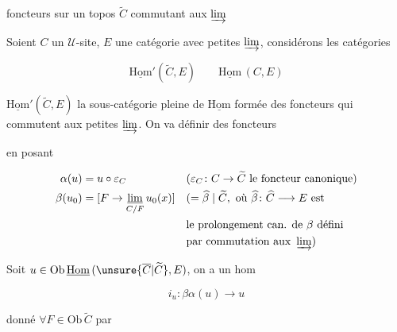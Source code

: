 foncteurs sur un topos $\widetilde C$ commutant aux $\varinjlim$

Soient $C$ un $\mathcal U$-site, $E$ une catégorie avec petites $\varinjlim$, considérons les catégories

\[
\underline{\mathrm{Hom}}'(\widetilde C,E)\qquad\underline{\mathrm{Hom}}\,(C,E)
\]

  $\underline{\mathrm{Hom}}'(\widetilde C,E)$  la sous-catégorie pleine de $\underline{\mathrm{Hom}}$ formée des foncteurs qui commutent aux petites $\varinjlim$. On va définir des foncteurs


en posant

\[
\begin{aligned}
\alpha(u)&=u\circ\varepsilon_C
 &&(\varepsilon_C\colon C\to\widetilde C\ \text{le foncteur canonique})\\
\beta(u_0)&=[F\to\mathop{\underline{\lim}}_{C/F}u_0(x)]
 &&(=\widehat\beta\mid\widetilde C,\ \text{où }\widehat\beta\colon\widehat C\longrightarrow E\ \text{est}\\
&&&\text{le prolongement can. de }\beta\ \text{défini}\\
&&&\text{par commutation aux }\varinjlim)
\end{aligned}
\]


Soit $u\in\mathrm{Ob}\,\underline{\mathrm{Hom}}\,(\unsure{\overline C|\widetilde C},E)$, on a un hom

\[
i_u\colon\beta\alpha(u)\longrightarrow u
\]

donné  $\forall F\in\mathrm{Ob}\,\widetilde C$ par

